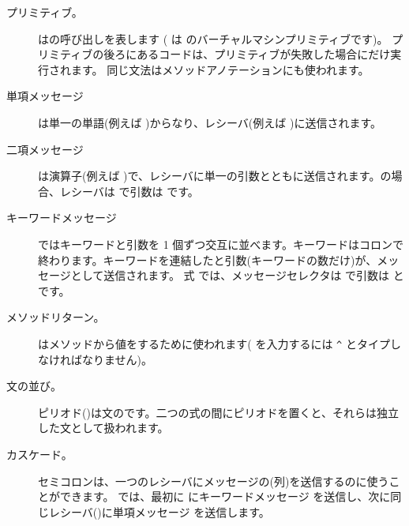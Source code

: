 \documentclass[a4paper,10pt,twoside]{book}
\begin{document}
\begin{description}
\item[プリミティブ。] はの呼び出しを表します
	( は  のバーチャルマシンプリミティブです)。
	プリミティブの後ろにあるコードは、プリミティブが失敗した場合にだけ実行されます。
	同じ文法はメソッドアノテーションにも使われます。

\item[単項メッセージ] は単一の単語(例えば )からなり、レシーバ(例えば )に送信されます。

\item[二項メッセージ] は演算子(例えば \ct{+})で、レシーバに単一の引数とともに送信されます。の場合、レシーバは  で引数は  です。

\item[キーワードメッセージ] ではキーワードと引数を 1 個ずつ交互に並べます。キーワードはコロンで終わります。キーワードを連結したと引数(キーワードの数だけ)が、メッセージとして送信されます。
式  では、メッセージセレクタは  で引数は  と  です。

\item[メソッドリターン。] \ct{^}はメソッドから値をするために使われます(\ct{^} を入力するには \verb|^| とタイプしなければなりません)。

\item[文の並び。] ピリオド()は文のです。二つの式の間にピリオドを置くと、それらは独立した文として扱われます。

\item[カスケード。] セミコロンは、一つのレシーバにメッセージの(列)を送信するのに使うことができます。 では、最初に  にキーワードメッセージ  を送信し、次に同じレシーバ()に単項メッセージ  を送信します。

\end{description}
\end{document}
